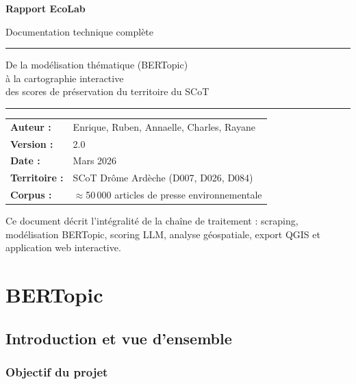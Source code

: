 \documentclass[12pt,a4paper]{report}
\begin{document}
\begin{titlepage}
  \centering
  \vspace*{2cm}
  {\Huge\bfseries Rapport EcoLab\par}
  \vspace{0.5em}
  {\Large\color{NavyBlue} Documentation technique complète\par}
  \vspace{2cm}
  \rule{\textwidth}{1pt}
  \vspace{1em}
  {\large
  De la modélisation thématique (BERTopic) \\[0.3em]
  à la cartographie interactive \\[0.3em]
  des scores de préservation du territoire du SCoT \par
  }
  \vspace{1em}
  \rule{\textwidth}{1pt}
  \vspace{2cm}
  \begin{tabular}{ll}
    \textbf{Auteur :}   & Enrique, Ruben, Annaelle, Charles, Rayane \\[0.3em]
    \textbf{Version :}  & 2.0 \\[0.3em]
    \textbf{Date :}     & Mars 2026 \\[0.3em]
    \textbf{Territoire :} & SCoT Drôme Ardèche (D007, D026, D084) \\[0.3em]
    \textbf{Corpus :}   & $\approx$50\,000 articles de presse environnementale \\[0.3em]
   
  \end{tabular}
  \vfill
  {\small Ce document décrit l'intégralité de la chaîne de traitement : scraping, modélisation BERTopic, scoring LLM, analyse géospatiale, export QGIS et application web interactive.}
\end{titlepage}

\tableofcontents
\clearpage

\chapter{BERTopic}

\section{Introduction et vue d'ensemble}

\subsection{Objectif du projet}
\end{document}
